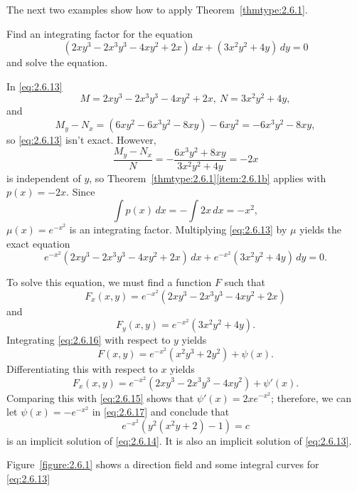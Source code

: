 \documentclass{ximera}
\begin{document}
The next two examples show how to apply
Theorem~\ref{thmtype:2.6.1}.

\begin{example}\label{example:2.6.1}
Find an integrating factor for the equation
\begin{equation}\label{eq:2.6.13}
(2xy^3-2x^3y^3-4xy^2+2x)\,dx+(3x^2y^2+4y)\,dy=0
\end{equation}
and solve the equation.
\begin{explanation}
In \eqref{eq:2.6.13}
$$
M=2xy^3-2x^3y^3-4xy^2+2x,\ N=3x^2y^2+4y,
$$
and
$$
M_y-N_x=(6xy^2-6x^3y^2-8xy)-6xy^2=-6x^3y^2-8xy,
$$
so \eqref{eq:2.6.13}  isn't  exact. However,
$$
\frac{M_y-N_x}{N}=-\frac{6x^3y^2+8xy}{3x^2y^2+4y}=-2x
$$
is independent of $y$, so Theorem~\ref{thmtype:2.6.1}\ref{item:2.6.1b} applies
with
$p(x)=-2x$. Since
$$
\int p (x)\,dx=-\int 2x\,dx=-x^2,
$$
 $\mu(x)=e^{-x^2}$ is an
integrating factor.  Multiplying \eqref{eq:2.6.13} by $\mu$ yields the
exact equation
\begin{equation}\label{eq:2.6.14}
e^{-x^2}(2xy^3-2x^3y^3-4xy^2+2x)\,dx+
 e^{-x^2}(3x^2y^2+4y)\,dy=0.
\end{equation}

To solve this equation, we must find a
function $F$ such that
\begin{equation}\label{eq:2.6.15}
F_x(x,y)=e^{-x^2}(2xy^3-2x^3y^3-4xy^2+2x)
\end{equation}
 and
\begin{equation}\label{eq:2.6.16}
F_y(x,y)=e^{-x^2}(3x^2y^2+4y).
\end{equation}
 Integrating \eqref{eq:2.6.16} with respect to $y$ yields
\begin{equation}\label{eq:2.6.17}
F(x,y)=e^{-x^2}(x^2y^3+2y^2)+\psi(x).
\end{equation}
 Differentiating this with respect to $x$ yields
$$
F_x(x,y)=e^{-x^2}(2xy^3-2x^3y^3-4xy^2)+\psi'(x).
$$
Comparing this with \eqref{eq:2.6.15} shows that $\psi'(x)=
2xe^{-x^2}$;  therefore, we can let $\psi(x)=-e^{-x^2}$ in
\eqref{eq:2.6.17} and conclude that
$$
e^{-x^2}\left(y^2(x^2y+2)-1\right)=c
$$
is an implicit solution of \eqref{eq:2.6.14}. It is also an implicit solution
of \eqref{eq:2.6.13}.

Figure~\ref{figure:2.6.1}  shows a  direction field and some integral curves
for \eqref{eq:2.6.13}


\end{explanation}
\end{example}
\end{document}
